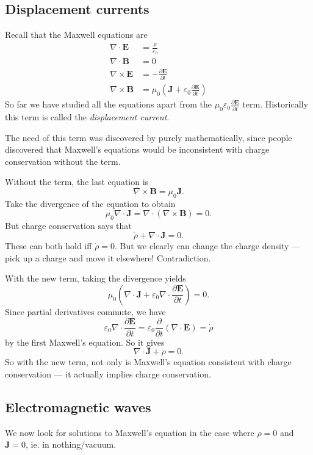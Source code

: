 \documentclass[a4paper]{article}
\begin{document}
\subsection{Displacement currents}
Recall that the Maxwell equations are
\begin{align*}
  \nabla \cdot \mathbf{E} &= \frac{\rho}{\varepsilon_0}\\
  \nabla \cdot \mathbf{B} &= 0\\
  \nabla \times \mathbf{E} &= -\frac{\partial \mathbf{E}}{\partial t}\\
  \nabla \times \mathbf{B} &= \mu_0\left(\mathbf{J} + \varepsilon_0 \frac{\partial \mathbf{E}}{\partial t}\right)
\end{align*}
So far we have studied all the equations apart from the $\mu_0\varepsilon_0 \frac{\partial \mathbf{E}}{\partial t}$ term. Historically this term is called the \emph{displacement current}.

The need of this term was discovered by purely mathematically, since people discovered that Maxwell's equations would be inconsistent with charge conservation without the term.

Without the term, the last equation is
\[
  \nabla \times \mathbf{B} = \mu_0 \mathbf{J}.
\]
Take the divergence of the equation to obtain
\[
  \mu_0 \nabla\cdot \mathbf{J} = \nabla\cdot (\nabla\times \mathbf{B}) = 0.
\]
But charge conservation says that
\[
  \dot{\rho} + \nabla\cdot \mathbf{J} = 0.
\]
These can both hold iff $\dot{\rho} = 0$. But we clearly can change the charge density --- pick up a charge and move it elsewhere! Contradiction.


With the new term, taking the divergence yields
\[
  \mu_0\left(\nabla\cdot \mathbf{J} + \varepsilon_0 \nabla\cdot \frac{\partial \mathbf{E}}{\partial t}\right) = 0.
\]
Since partial derivatives commute, we have
\[
  \varepsilon_0\nabla\cdot \frac{\partial \mathbf{E}}{\partial t} = \varepsilon_0 \frac{\partial}{\partial t} (\nabla\cdot \mathbf{E}) = \dot{\rho}
\]
by the first Maxwell's equation. So it gives
\[
  \nabla\cdot \mathbf{J} + \dot{\rho} = 0.
\]
So with the new term, not only is Maxwell's equation consistent with charge conservation --- it actually implies charge conservation.

\subsection{Electromagnetic waves}
We now look for solutions to Maxwell's equation in the case where $\rho = 0$ and $\mathbf{J} = 0$, ie. in nothing/vacuum.
\end{document}
